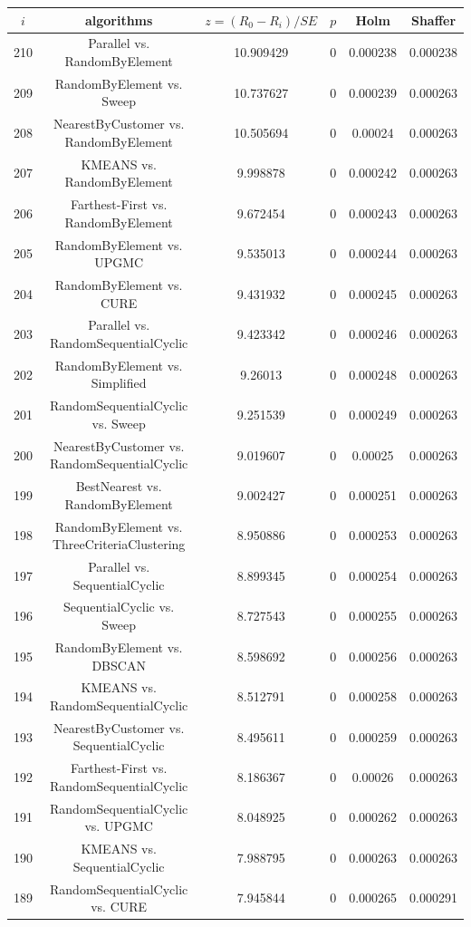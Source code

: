 \documentclass[a4paper,10pt]{article}
\begin{document}
\begin{landscape}
\begin{table}[!htp]
\centering\scriptsize
\begin{tabular}{cccccc}
$i$&algorithms&$z=(R_0 - R_i)/SE$&$p$&Holm&Shaffer\\
\hline210&Parallel vs. RandomByElement&10.909429&0&0.000238&0.000238\\
209&RandomByElement vs. Sweep&10.737627&0&0.000239&0.000263\\
208&NearestByCustomer vs. RandomByElement&10.505694&0&0.00024&0.000263\\
207&KMEANS vs. RandomByElement&9.998878&0&0.000242&0.000263\\
206&Farthest-First vs. RandomByElement&9.672454&0&0.000243&0.000263\\
205&RandomByElement vs. UPGMC&9.535013&0&0.000244&0.000263\\
204&RandomByElement vs. CURE&9.431932&0&0.000245&0.000263\\
203&Parallel vs. RandomSequentialCyclic&9.423342&0&0.000246&0.000263\\
202&RandomByElement vs. Simplified&9.26013&0&0.000248&0.000263\\
201&RandomSequentialCyclic vs. Sweep&9.251539&0&0.000249&0.000263\\
200&NearestByCustomer vs. RandomSequentialCyclic&9.019607&0&0.00025&0.000263\\
199&BestNearest vs. RandomByElement&9.002427&0&0.000251&0.000263\\
198&RandomByElement vs. ThreeCriteriaClustering&8.950886&0&0.000253&0.000263\\
197&Parallel vs. SequentialCyclic&8.899345&0&0.000254&0.000263\\
196&SequentialCyclic vs. Sweep&8.727543&0&0.000255&0.000263\\
195&RandomByElement vs. DBSCAN&8.598692&0&0.000256&0.000263\\
194&KMEANS vs. RandomSequentialCyclic&8.512791&0&0.000258&0.000263\\
193&NearestByCustomer vs. SequentialCyclic&8.495611&0&0.000259&0.000263\\
192&Farthest-First vs. RandomSequentialCyclic&8.186367&0&0.00026&0.000263\\
191&RandomSequentialCyclic vs. UPGMC&8.048925&0&0.000262&0.000263\\
190&KMEANS vs. SequentialCyclic&7.988795&0&0.000263&0.000263\\
189&RandomSequentialCyclic vs. CURE&7.945844&0&0.000265&0.000291\\

\end{tabular}
\end{table}
\end{landscape}
\end{document}
